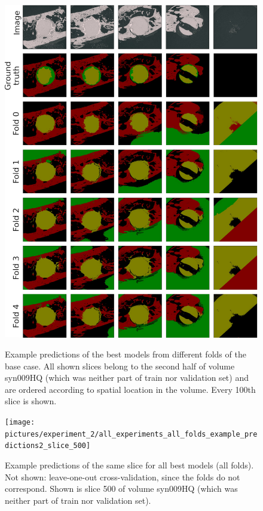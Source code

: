 \begin{figure}[p]
    \centering
    \includegraphics[width=\textwidth]{pictures/experiment_2/for_paper_base-case_final_example_predictions_2_all_folds}\\
    \caption[Foldwise Predictions of the Base Case]{Example predictions of the best models from different folds of the base case. All shown slices belong to the second half of volume syn009HQ (which was neither part of train nor validation set) and are ordered according to spatial location in the volume. Every 100th slice is shown.}
    \label{fig:example-predictions-folds-base-case}
\end{figure}


\begin{figure}[p]
    \centering
    \texttt{[image: pictures/experiment\_2/all\_experiments\_all\_folds\_example\_predictions2\_slice\_500]}\\
    \caption[Comparison of Predicitons for Same Slice]{Example predictions of the same slice for all best models (all folds). Not shown: leave-one-out cross-validation, since the folds do not correspond. Shown is slice 500 of volume syn009HQ (which was neither part of train nor validation set).}
    \label{fig:full-example-predictions-slice500}
\end{figure}



